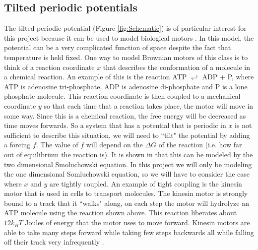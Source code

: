 \subsection{Tilted periodic potentials}
The tilted periodic potential (Figure \ref{fig:Schematic}) is of particular interest for this project because it can be used to model biological motors \cite{Leibler1993,Magnasco1994}. In this model, the potential can be a very complicated function of space despite the fact that temperature is held fixed. One way to model Brownian motors of this class is to think of a reaction coordinate $x$ that describes the conformation of a molecule in a chemical reaction. An example of this is the reaction ATP $\rightleftharpoons$ ADP + P, where ATP is adenosine tri-phosphate, ADP is adenosine di-phosphate and P is a lone phosphate molecule. This reaction coordinate is then coupled to a mechanical coordinate $y$ so that each time that a reaction takes place, the motor will move in some way. Since this is a chemical reaction, the free energy will be decreased as time moves forwards. So a system that has a potential that is periodic in $x$ is not sufficient to describe this situation, we will need to ``tilt" the potential by adding a forcing $f$. The value of $f$ will depend on the $\Delta G$ of the reaction (i.e. how far out of equilibrium the reaction is). It is shown in \cite{Magnasco1994} that this can be modeled by the two dimensional Smoluchowski equation. In this project we will only be modeling the one dimensional Somluchowski equation, so we will have to consider the case where $x$ and $y$ are tightly coupled. An example of tight coupling is the kinesin motor \cite{Leibler1993} that is used in cells to transport molecules. The kinesin motor is strongly bound to a track that it ``walks" along, on each step the motor will hydrolyze an ATP molecule using the reaction shown above. This reaction liberates about $12 k_B T$ Joules of energy that the motor uses to move forward. Kinesin motors are able to take many steps forward while taking few steps backwards all while falling off their track very infrequently \cite{BlockSM1990}.
